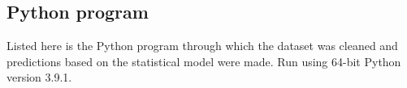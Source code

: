 \documentclass[11pt,letterpaper]{article}
\begin{document}
\subsection{Python program}
\label{app:scripts}

Listed here is the Python program through which the dataset was cleaned and predictions based on the statistical model were made. Run using 64-bit Python version 3.9.1.


\end{document}
